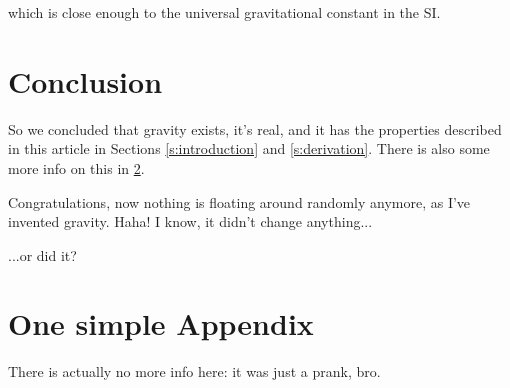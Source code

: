 \documentclass[preprint,12pt]{elsarticle}
\begin{document}
\noindent
which is close enough to the universal gravitational constant in the SI.

\section{Conclusion}

So we concluded that gravity exists, it's real, and it has the properties described in this article in Sections \ref{s:introduction} and \ref{s:derivation}. There is also some more info on this in \ref{s:appendix}.

Congratulations, now nothing is floating around randomly anymore, as I've invented gravity. Haha! I know, it didn't change anything...

\noindent
...or did it?

 

\newpage
\appendix
\section{One simple Appendix}\label{s:appendix}

There is actually no more info here: it was just a prank, bro.
\end{document}
